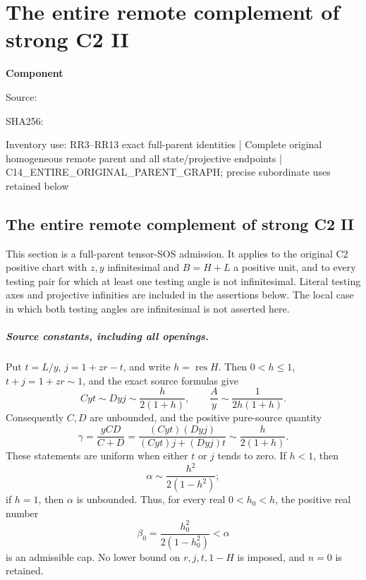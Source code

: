 \chapter{The entire remote complement of strong C2 II}
\label{component:p590112f102bd}
\noindent\textbf{Component }\par
{\small\noindent Source: \par}
{\small\noindent SHA256: \par}
{\small\noindent Inventory use: RR3--RR13 exact full-parent identities | Complete original homogeneous remote parent and all state/projective endpoints | C14\_\allowbreak{}ENTIRE\_\allowbreak{}ORIGINAL\_\allowbreak{}PARENT\_\allowbreak{}GRAPH; precise subordinate uses retained below\par}
\medskip
\section{The entire remote complement of strong C2 II}
\label{p590112f102bd:sec:r7-c2-remote}

This section is a full-parent tensor-SOS admission.  It applies to the
original C2 positive chart with $z,y$ infinitesimal and $B=H+L$ a
positive unit, and to every testing pair for which at least one testing
angle is not infinitesimal.  Literal testing axes and projective
infinities are included in the assertions below.  The local case in
which both testing angles are infinitesimal is not asserted here.

\paragraph{Source constants, including all openings.}
Put $t=L/y$, $j=1+zr-t$, and write $h=\operatorname{res}H$.
Then $0<h\leq1$, $t+j=1+zr\sim1$, and the exact source formulas give
\[
 Cyt\sim Dyj\sim\frac{h}{2(1+h)},\qquad
 \frac Ay\sim\frac1{2h(1+h)}.
\]
Consequently $C,D$ are unbounded, and the positive pure-source quantity
\[
 \gamma=\frac{yCD}{C+D}
 =\frac{(Cyt)(Dyj)}{(Cyt)j+(Dyj)t}
 \sim\frac{h}{2(1+h)}.                                      \tag{RR1}
\]
These statements are uniform when either $t$ or $j$ tends to zero.
If $h<1$, then
\[
 \alpha\sim\frac{h^2}{2(1-h^2)};
\]
if $h=1$, then $\alpha$ is unbounded.  Thus, for every real
$0<h_0<h$, the positive real number
\[
 \beta_0=\frac{h_0^2}{2(1-h_0^2)}<\alpha                     \tag{RR2}
\]
is an admissible cap.  No lower bound on $r,j,t,1-H$ is imposed,
and $n=0$ is retained.

